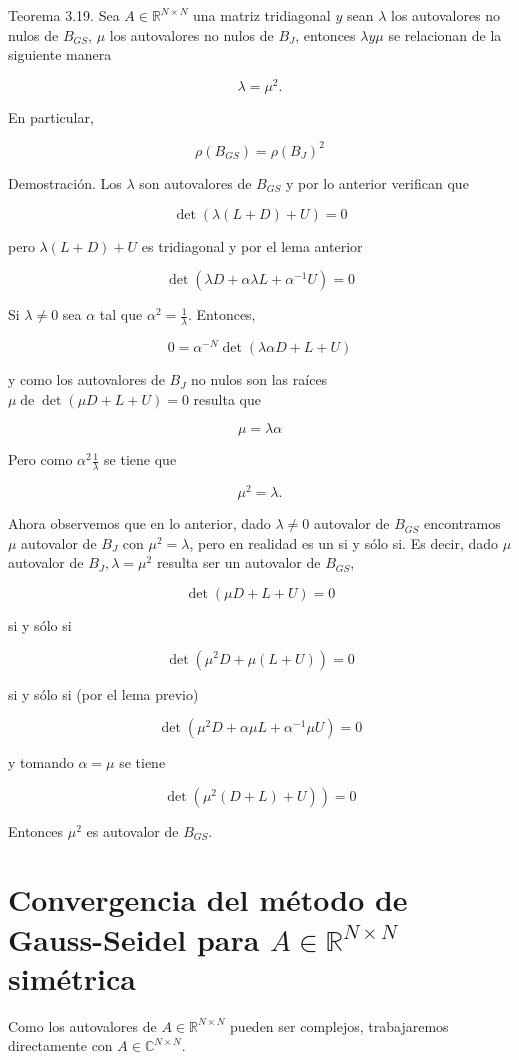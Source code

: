 \documentclass[10pt]{article}
\begin{document}
Teorema 3.19. Sea $A \in \mathbb{R}^{N \times N}$ una matriz tridiagonal $y$ sean $\lambda$ los autovalores no nulos de $B_{G S}$, $\mu$ los autovalores no nulos de $B_{J}$, entonces $\lambda y \mu$ se relacionan de la siguiente manera

$$
\lambda=\mu^{2} .
$$

En particular,

$$
\rho\left(B_{G S}\right)=\rho\left(B_{J}\right)^{2}
$$

Demostración. Los $\lambda$ son autovalores de $B_{G S}$ y por lo anterior verifican que

$$
\operatorname{det}(\lambda(L+D)+U)=0
$$

pero $\lambda(L+D)+U$ es tridiagonal y por el lema anterior

$$
\operatorname{det}\left(\lambda D+\alpha \lambda L+\alpha^{-1} U\right)=0
$$

Si $\lambda \neq 0$ sea $\alpha$ tal que $\alpha^{2}=\frac{1}{\lambda}$. Entonces,

$$
0=\alpha^{-N} \operatorname{det}(\lambda \alpha D+L+U)
$$

y como los autovalores de $B_{J}$ no nulos son las raíces $\mu \operatorname{de} \operatorname{det}(\mu D+L+U)=0$ resulta que

$$
\mu=\lambda \alpha
$$

Pero como $\alpha^{2} \frac{1}{\lambda}$ se tiene que

$$
\mu^{2}=\lambda .
$$

Ahora observemos que en lo anterior, dado $\lambda \neq 0$ autovalor de $B_{G S}$ encontramos $\mu$ autovalor de $B_{J}$ con $\mu^{2}=\lambda$, pero en realidad es un si y sólo si. Es decir, dado $\mu$ autovalor de $B_{J}, \lambda=\mu^{2}$ resulta ser un autovalor de $B_{G S}$,

$$
\operatorname{det}(\mu D+L+U)=0
$$

si y sólo si

$$
\operatorname{det}\left(\mu^{2} D+\mu(L+U)\right)=0
$$

si y sólo si (por el lema previo)

$$
\operatorname{det}\left(\mu^{2} D+\alpha \mu L+\alpha^{-1} \mu U\right)=0
$$

y tomando $\alpha=\mu$ se tiene

$$
\left.\operatorname{det}\left(\mu^{2}(D+L)+U\right)\right)=0
$$

Entonces $\mu^{2}$ es autovalor de $B_{G S}$.

\section*{Convergencia del método de Gauss-Seidel para $A \in \mathbb{R}^{N \times N}$ simétrica}
Como los autovalores de $A \in \mathbb{R}^{N \times N}$ pueden ser complejos, trabajaremos directamente con $A \in \mathbb{C}^{N \times N}$.
\end{document}
